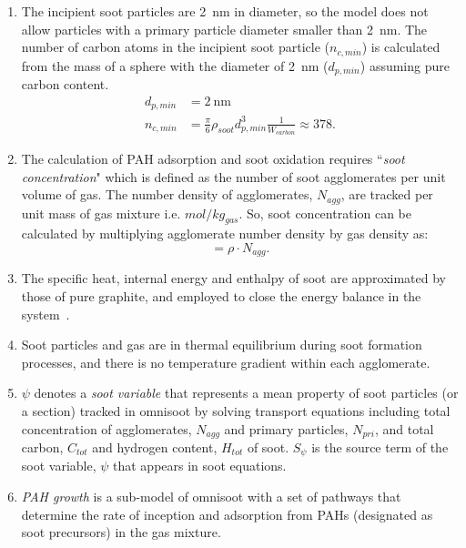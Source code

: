 \begin{enumerate}
\item The incipient soot particles are 2~nm in diameter, so the model does not allow particles with a primary particle diameter smaller than 2~nm. The number of carbon atoms in the incipient soot particle ($n_{c,min}$) is calculated from the mass of a sphere with the diameter of 2~nm ($d_{p,min}$) assuming pure carbon content.
\begin{equation}
	\begin{split}
	d_{p,min}&=2~\mathrm{nm} \\
	n_{c,min}& =\frac{\pi}{6}\rho_{soot}d^3_{p,min}\frac{1}{W_{carbon}}\approx378
	\label{eqn:dp_min}.
	\end{split}
\end{equation}
\item The calculation of PAH adsorption and soot oxidation requires ``\textit{soot concentration}" which is defined as the number of soot agglomerates per unit volume of gas. The number density of agglomerates,  ${N_{agg}}$, are tracked per unit mass of gas mixture i.e. ${mol/kg_{gas}}$. So, soot concentration can be calculated by multiplying agglomerate number density by gas density as:
\begin{equation}
	[\mathrm{soot}] = \rho\cdot {N_{agg}}
	\label{eqn:sootconcen}.
\end{equation}

\item The specific heat, internal energy and enthalpy of soot are approximated by those of pure graphite, and employed to close the energy balance in the system~\cite{mcbride1993coefficients}.

\item Soot particles and gas are in thermal equilibrium during soot formation processes, and there is no temperature gradient within each agglomerate.


\item $\psi$ denotes a \textit{soot variable} that represents a mean property of soot particles (or a section) tracked in omnisoot by solving transport equations including total concentration of agglomerates, $N_{agg}$ and primary particles, $N_{pri}$, and total carbon, $C_{tot}$ and hydrogen content, $H_{tot}$ of soot. $S_{\psi}$ is the source term of the soot variable, $\psi$ that appears in soot equations. %

\item \textit{PAH growth} is a sub-model of omnisoot with a set of pathways that determine the rate of inception and adsorption from PAHs (designated as soot precursors) in the gas mixture.


\end{enumerate}
